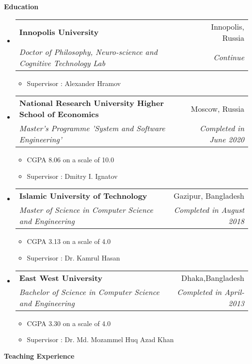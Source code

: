 \documentclass[letterpaper,10pt]{article}
\makeatletter
\newcommand{\resheading}[1]{{\large \colorbox{mygrey}{\begin{minipage}{\textwidth}{\textbf{#1 \vphantom{p\^{E}}}}\end{minipage}}}}
\newcommand{\ressubheading}[4]{
\begin{tabular*}{6.5in}{l@{\extracolsep{\fill}}r}
		\textbf{#1} & #2 \\
		\textit{#3} & \textit{#4} \\
\end{tabular*}\vspace{-6pt}}
\makeatother
\begin{document}
\resheading{Education}
\begin{itemize}


\item
	\ressubheading{Innopolis University}{Innopolis, Russia}{Doctor of Philosophy, Neuro-science and Cognitive Technology Lab}{Continue} 
	
		\begin{itemize}
	\item Supervisor :	Alexander Hramov
		\end{itemize}

\item
	\ressubheading{National Research University Higher School of Economics}{Moscow, Russia}{Master’s Programme 'System and Software Engineering'}{Completed in June 2020}
	\begin{itemize}

		\item  CGPA 8.06 on a scale of 10.0
		\item Supervisor : Dmitry I. Ignatov

	\end{itemize}


\item
	\ressubheading{Islamic University of Technology}{Gazipur, Bangladesh}{Master of Science in Computer Science and Engineering }{Completed in August 2018}
\begin{itemize}

		\item  CGPA 3.13  on a scale of 4.0
		\item Supervisor : Dr. Kamrul Hasan

	\end{itemize}
	
\item
	\ressubheading{East West University}{Dhaka,Bangladesh}{Bachelor of Science in Computer Science and Engineering}{Completed in April-2013}
	\begin{itemize}
		\item  CGPA 3.30 on a scale of 4.0
\item Supervisor : Dr. Md. Mozammel Huq Azad Khan
	\end{itemize}


\end{itemize}


\resheading{Teaching Experience}
\end{document}
